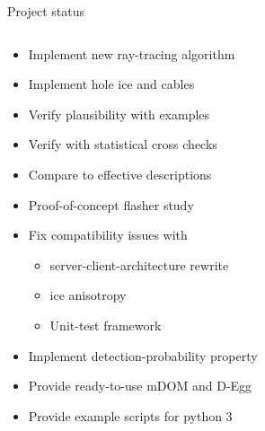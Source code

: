 
\begin{frame}[fragile]{Project status}

  \begin{columns}
    \begin{column}{0.5\textwidth}
      \begin{overlayarea}{\textwidth}{\textheight}
        \begin{itemize}
          \item<alert@1>[\done] Implement new ray-tracing algorithm
          \item<alert@2>[\done] Implement hole ice and cables
          \item<alert@3>[\done] Verify plausibility with examples
          \item<alert@4>[\done] Verify with statistical cross checks
          \item<alert@5>[\done] Compare to effective descriptions
          \item<alert@6>[\done] Proof-of-concept flasher study
          \item<alert@7>[\inprogress] Fix compatibility issues with
          \begin{itemize}
            \item[\inprogress] server-client-architecture rewrite
            \item[\tobedone] ice anisotropy
            \item[\tobedone] Unit-test framework
          \end{itemize}
          \item<alert@8>[\tobedone] Implement detection-probability property
          \item<alert@9>[\tobedone] Provide ready-to-use mDOM and D-Egg
          \item<alert@10>[\tobedone] Provide example scripts for python 3
        \end{itemize}
      \end{overlayarea}
    \end{column}
    \begin{column}{0.5\textwidth}%
\end{column}
\end{columns}
\end{frame}
